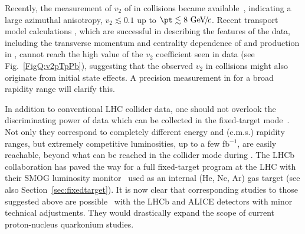 \documentclass[../report.tex]{subfiles}
\begin{document}
Recently, the measurement of $v_2$ of \PJgy in \pPb collisions became available~\cite{Acharya:2017tfn,Sirunyan:2018kiz}, indicating a large azimuthal anisotropy, $v_2 \lesssim 0.1$ up to $\pt \lesssim 8\UGeVc$.
Recent transport model calculations \cite{Du:2018wsj}, which are successful in describing the features of the data, including the transverse momentum and centrality dependence of  \PJgy  and  production in \pPb, cannot reach the high value of the $v_2$ coefficient seen in data \cite{Acharya:2017tfn,Sirunyan:2018kiz} (see Fig.~\ref{FigQ:v2pTpPb}),
suggesting that the observed $v_2$ in \pPb collisions might also originate from initial state effects.
A precision measurement in \RunsThreeFour for a broad rapidity range %
will clarify this.


In addition to conventional LHC collider data, one should not overlook the discriminating power of data which can be collected in the fixed-target mode~\cite{Brodsky:2012vg,Lansberg:2012kf}. Not only they correspond to completely different energy and (c.m.s.) rapidity ranges, but extremely competitive luminosities, up to a few fb$^{-1}$, are easily reachable, beyond what can be reached in the collider mode during \RunsThreeFour. The LHCb collaboration has paved the way for a full fixed-target program at the LHC with their SMOG luminosity monitor~\cite{FerroLuzzi:2005em} used as an internal (He, Ne, Ar) gas target \cite{Aaij:2018ogq} (see also Section~\ref{sec:fixedtarget}). It is now clear that corresponding studies to those suggested above are possible~\cite{Hadjidakis:2018ifr} with the LHCb and ALICE detectors with minor technical adjustments. They would drastically expand the scope of current proton-nucleus quarkonium studies.
\end{document}
